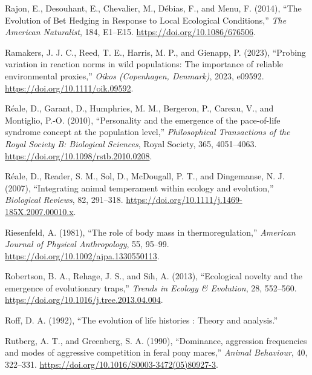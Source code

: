 \documentclass[
  12pt,
  letterpaper,
]{scrartcl}
\newlength{\cslhangindent}
\newenvironment{CSLReferences}[2] %
 {\begin{list}{}{%
  \setlength{\itemindent}{0pt}
  \setlength{\leftmargin}{0pt}
  \setlength{\parsep}{0pt}
  \ifodd #1
   \setlength{\leftmargin}{\cslhangindent}
   \setlength{\itemindent}{-1\cslhangindent}
  \fi
  \setlength{\itemsep}{#2\baselineskip}}}
 {\end{list}}
\begin{document}
\begin{CSLReferences}{1}{0}
Rajon, E., Desouhant, E., Chevalier, M., Débias, F., and Menu, F.
(2014), {``The {Evolution} of {Bet Hedging} in {Response} to {Local
Ecological Conditions},''} \emph{The American Naturalist}, 184, E1--E15.
\url{https://doi.org/10.1086/676506}.

Ramakers, J. J. C., Reed, T. E., Harris, M. P., and Gienapp, P. (2023),
{``Probing variation in reaction norms in wild populations: {The}
importance of reliable environmental proxies,''} \emph{Oikos
(Copenhagen, Denmark)}, 2023, e09592.
\url{https://doi.org/10.1111/oik.09592}.

Réale, D., Garant, D., Humphries, M. M., Bergeron, P., Careau, V., and
Montiglio, P.-O. (2010), {``Personality and the emergence of the
pace-of-life syndrome concept at the population level,''}
\emph{Philosophical Transactions of the Royal Society B: Biological
Sciences}, Royal Society, 365, 4051--4063.
\url{https://doi.org/10.1098/rstb.2010.0208}.

Réale, D., Reader, S. M., Sol, D., McDougall, P. T., and Dingemanse, N.
J. (2007), {``Integrating animal temperament within ecology and
evolution,''} \emph{Biological Reviews}, 82, 291--318.
\url{https://doi.org/10.1111/j.1469-185X.2007.00010.x}.

Riesenfeld, A. (1981), {``The role of body mass in thermoregulation,''}
\emph{American Journal of Physical Anthropology}, 55, 95--99.
\url{https://doi.org/10.1002/ajpa.1330550113}.

Robertson, B. A., Rehage, J. S., and Sih, A. (2013), {``Ecological
novelty and the emergence of evolutionary traps,''} \emph{Trends in
Ecology \& Evolution}, 28, 552--560.
\url{https://doi.org/10.1016/j.tree.2013.04.004}.

Roff, D. A. (1992), {``The evolution of life histories : {Theory} and
analysis.''}

Rutberg, A. T., and Greenberg, S. A. (1990), {``Dominance, aggression
frequencies and modes of aggressive competition in feral pony mares,''}
\emph{Animal Behaviour}, 40, 322--331.
\url{https://doi.org/10.1016/S0003-3472(05)80927-3}.


\end{CSLReferences}
\end{document}
